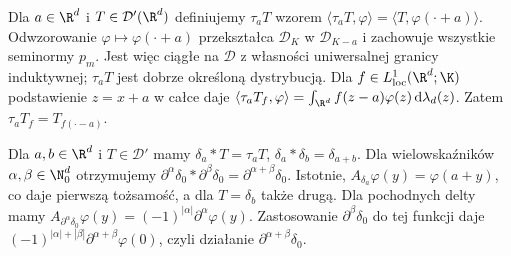 \begin{definicja}
\label{def:translation21}
Dla $a\in\R^d$ i $T\in\mathcal D'(\R^d)$ definiujemy
$\tau_aT$ wzorem
$\langle\tau_aT,\varphi\rangle=
\langle T,\varphi(\cdot+a)\rangle$.
Odwzorowanie $\varphi\mapsto\varphi(\cdot+a)$
przekształca $\mathcal D_K$ w $\mathcal D_{K-a}$ i
zachowuje wszystkie seminormy $p_m$. Jest więc ciągłe
na $\mathcal D$ z własności uniwersalnej granicy
induktywnej; $\tau_aT$ jest dobrze określoną dystrybucją.
Dla $f\in L^1_{\mathrm{loc}}(\R^d;\K)$ podstawienie
$z=x+a$ w całce daje
$\langle\tau_aT_f,\varphi\rangle
=\int_{\R^d}f(z-a)\varphi(z)\,\mathrm d\lambda_d(z)$.
Zatem $\tau_aT_f=T_{f(\cdot-a)}$.
\end{definicja}

\begin{przyklad}
\label{ex:delta-convolution21}
Dla $a,b\in\R^d$ i $T\in\mathcal D'$ mamy
$\delta_a*T=\tau_aT$, $\delta_a*\delta_b=\delta_{a+b}$.
Dla wielowskaźników $\alpha,\beta\in\N_0^d$ otrzymujemy
$\partial^\alpha\delta_0*\partial^\beta\delta_0
=\partial^{\alpha+\beta}\delta_0$.
Istotnie, $A_{\delta_a}\varphi(y)=\varphi(a+y)$,
co daje pierwszą tożsamość, a dla $T=\delta_b$
także drugą. Dla pochodnych delty mamy
$A_{\partial^\alpha\delta_0}\varphi(y)
=(-1)^{|\alpha|}\partial^\alpha\varphi(y)$.
Zastosowanie $\partial^\beta\delta_0$ do tej funkcji
daje $(-1)^{|\alpha|+|\beta|}
\partial^{\alpha+\beta}\varphi(0)$, czyli działanie
$\partial^{\alpha+\beta}\delta_0$.
\end{przyklad}

